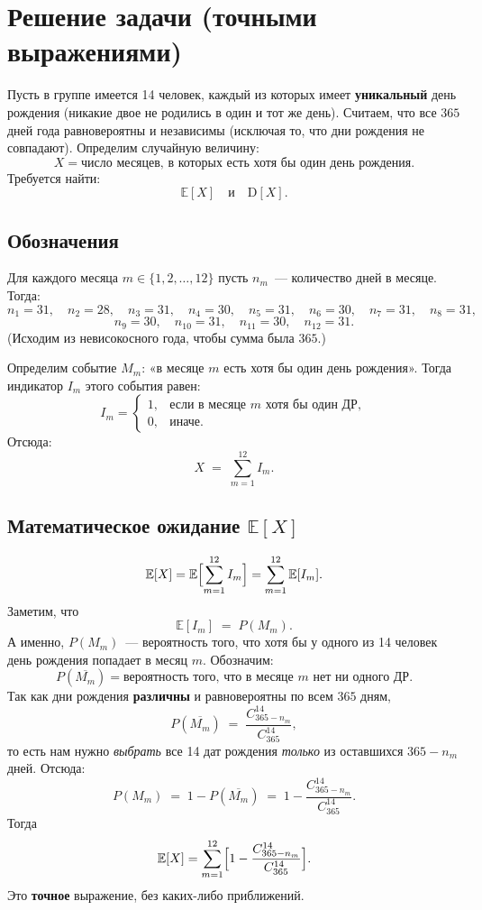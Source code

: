 \documentclass{article}
\begin{document}
\section*{Решение задачи (точными выражениями)}

Пусть в группе имеется 14 человек, каждый из которых имеет \textbf{уникальный} день рождения (никакие двое не родились в один и тот же день). Считаем, что все \(365\) дней года равновероятны и независимы (исключая то, что дни рождения не совпадают). Определим случайную величину:
\[
X = \text{число месяцев, в которых есть хотя бы один день рождения}.
\]
Требуется найти:
\[
\mathbb{E}[X]
\quad \text{и} \quad
\mathrm{D}[X].
\]

\subsection*{Обозначения}

Для каждого месяца \(m \in \{1,2,\dots,12\}\) пусть \(n_m\)~--- количество дней в месяце. Тогда:
\[
n_1 = 31, \quad n_2 = 28, \quad n_3 = 31, \quad n_4 = 30, \quad
n_5 = 31, \quad n_6 = 30, \quad n_7 = 31, \quad n_8 = 31,
\]
\[
n_9 = 30, \quad n_{10} = 31, \quad n_{11} = 30, \quad n_{12} = 31.
\]
(Исходим из невисокосного года, чтобы сумма была \(365\).)

Определим событие \(M_m\): «в месяце \(m\) есть хотя бы один день рождения».
Тогда индикатор \(I_m\) этого события равен:
\[
I_m =
\begin{cases}
1, & \text{если в месяце \(m\) хотя бы один ДР},\\
0, & \text{иначе}.
\end{cases}
\]
Отсюда:
\[
X \;=\; \sum_{m=1}^{12} I_m.
\]

\subsection*{Математическое ожидание \(\mathbb{E}[X]\)}

\[
\mathbb{E}[X]
= \mathbb{E}\Bigl[\sum_{m=1}^{12} I_m\Bigr]
= \sum_{m=1}^{12} \mathbb{E}[I_m].
\]
Заметим, что
\[
\mathbb{E}[I_m] \;=\; P(M_m).
\]
А именно, \(P(M_m)\)~--- вероятность того, что хотя бы у одного из 14 человек день рождения попадает в месяц \(m\). Обозначим:
\[
P(\overline{M_m}) = \text{вероятность того, что в месяце \(m\) нет ни одного ДР}.
\]
Так как дни рождения \textbf{различны} и равновероятны по всем \(365\) дням,
\[
P(\overline{M_m}) \;=\; \frac{C_{365 - n_m}^{14}}{C_{365}^{14}},
\]
то есть нам нужно \emph{выбрать} все 14 дат рождения \emph{только} из оставшихся \(365 - n_m\) дней. Отсюда:
\[
P(M_m)
\;=\; 1 - P(\overline{M_m})
\;=\; 1 - \frac{C_{365 - n_m}^{14}}{C_{365}^{14}}.
\]
Тогда
\[
\mathbb{E}[X]
= \sum_{m=1}^{12}
\Bigl[1 - \frac{C_{365 - n_m}^{14}}{C_{365}^{14}}\Bigr].
\]
Это \textbf{точное} выражение, без каких-либо приближений.
\end{document}
